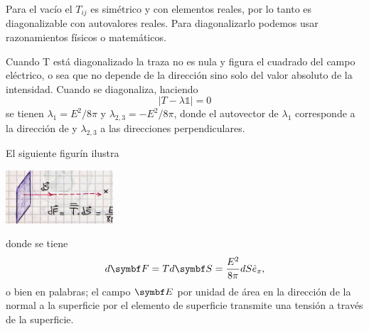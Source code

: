 \documentclass[10pt,oneside]{CBFT_book}
\begin{document}
Para el vacío el $T_{ij}$ es simétrico y con elementos reales, por lo tanto es diagonalizable 
con autovalores reales.
Para diagonalizarlo podemos usar razonamientos físicos o matemáticos.

Cuando T está diagonalizado la traza no es nula y figura el cuadrado del campo eléctrico,
o sea que no depende de la dirección sino solo del valor absoluto de la intensidad.
Cuando se diagonaliza, haciendo
\[
	| T - \lambda \mathbb{1} | = 0
\]
se tienen $\lambda_1 = E^2 / 8\pi$ y $\lambda_{2,3} = - E^2 / 8\pi$, donde el
autovector de $\lambda_1$ corresponde a la dirección de  y $\lambda_{2,3}$
a las direcciones perpendiculares.

El siguiente figurín ilustra

\includegraphics[width=0.3\textwidth]{images/fig_ft1_tensorMax_B.jpg}

donde se tiene
\[
	d\vb{F} = T d\vb{S} = \frac{E^2}{8\pi} dS \hat{e}_x,
\]
o bien en palabras; el campo $\vb{E}$ por unidad de área en la dirección de la normal a la superficie
por el elemento de superficie transmite una tensión a través de la superficie.
\end{document}
